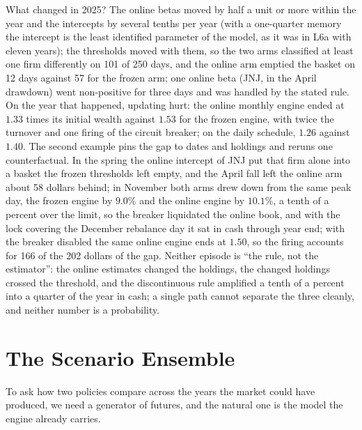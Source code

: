 \documentclass[11pt]{article}
\begin{document}
What changed in 2025? The online betas moved by half a unit or more within the year and the intercepts by several tenths per year (with a one-quarter memory the intercept is the least identified parameter of the model, as it was in L6a with eleven years); the thresholds moved with them, so the two arms classified at least one firm differently on 101 of 250 days, and the online arm emptied the basket on 12 days against 57 for the frozen arm; one online beta (JNJ, in the April drawdown) went non-positive for three days and was handled by the stated rule. On the year that happened, updating hurt: the online monthly engine ended at $1.33$ times its initial wealth against $1.53$ for the frozen engine, with twice the turnover and one firing of the circuit breaker; on the daily schedule, $1.26$ against $1.40$. The second example pins the gap to dates and holdings and reruns one counterfactual. In the spring the online intercept of JNJ put that firm alone into a basket the frozen thresholds left empty, and the April fall left the online arm about 58 dollars behind; in November both arms drew down from the same peak day, the frozen engine by $9.0\%$ and the online engine by $10.1\%$, a tenth of a percent over the limit, so the breaker liquidated the online book, and with the lock covering the December rebalance day it sat in cash through year end; with the breaker disabled the same online engine ends at $1.50$, so the firing accounts for 166 of the 202 dollars of the gap. Neither episode is ``the rule, not the estimator'': the online estimates changed the holdings, the changed holdings crossed the threshold, and the discontinuous rule amplified a tenth of a percent into a quarter of the year in cash; a single path cannot separate the three cleanly, and neither number is a probability.

\section{The Scenario Ensemble}

To ask how two policies compare across the years the market could have produced, we need a generator of futures, and the natural one is the model the engine already carries.
\end{document}
